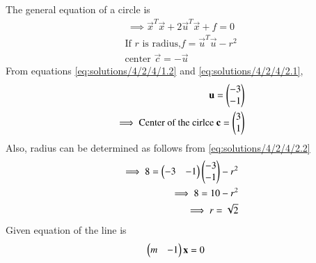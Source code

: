 The general equation of a circle is 
\begin{align}
\implies \vec{x}^T\vec{x}+ 2\vec{u}^T\vec{x} + f = 0 \label{eq:solutions/4/2/4/2.1}
\end{align}
\begin{align}
\text{If $r$ is radius,} f =\vec{u}^T\vec{u}-r^2  \label{eq:solutions/4/2/4/2.2} \\  
  \text{center }\vec{c} =-\vec{u}
\end{align}
From equations \ref{eq:solutions/4/2/4/1.2} and \ref{eq:solutions/4/2/4/2.1},
\begin{align}
 \mathbf{u}  = \begin{pmatrix}-3 \\ -1\end{pmatrix}\\
\implies \text{Center of the cirlce } \mathbf{c} = \begin{pmatrix}3 \\ 1\end{pmatrix}
\end{align}
Also, radius can be determined as follows from \ref{eq:solutions/4/2/4/2.2}
\begin{align}
  \implies 8=\begin{pmatrix}-3&-1\end{pmatrix}\begin{pmatrix}-3\\-1\end{pmatrix}-r^2\\
  \implies 8=10 -r^2\\
  \implies r=\sqrt{2}
\end{align}
Given equation of the line is
\begin{align}
\begin{pmatrix}m&-1\end{pmatrix}\mathbf{x}&=0 
\end{align}

